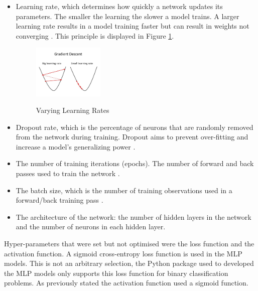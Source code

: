 \begin{itemize}
    \item Learning rate, which determines how quickly a network updates its parameters. The smaller the learning the slower a model trains. A larger learning rate results in a model training faster but can result in weights not converging \parencite{NN_HP}. This principle is displayed in Figure \ref{fig:learning_rates}. 
    
    \vspace{10 pt}

    \begin{figure}[!htb]
    \centering
    \includegraphics[width=0.32\textwidth]{images/learning_rate.jpg}
    \caption{Varying Learning Rates}
    \label{fig:learning_rates}
    \parencite{learning_rate}
    \end{figure}
    
    \vspace{10 pt}
    
    \item Dropout rate, which is the percentage of neurons that are randomly removed from the network during training. Dropout aims to prevent over-fitting and increase a model's generalizing power \parencite{learning_rate}. 
    
    \item The number of training iterations (epochs). The number of forward and back passes used to train the network \parencite{NN_HP}.
    
    \item The batch size, which is the number of training observations used in a forward/back training pass \parencite{NN_HP}. 
    
    \item The architecture of the network: the number of hidden layers in the network and the number of neurons in each hidden layer. 

\end{itemize}

 
\vspace{10 pt}

Hyper-parameters that were set but not optimised were the loss function and the activation function. A sigmoid cross-entropy loss function is used in the MLP models. This is not an arbitrary selection, the Python package used to developed the MLP models only supports this loss function for binary classification problems. As previously stated the activation function used a sigmoid function. \\

